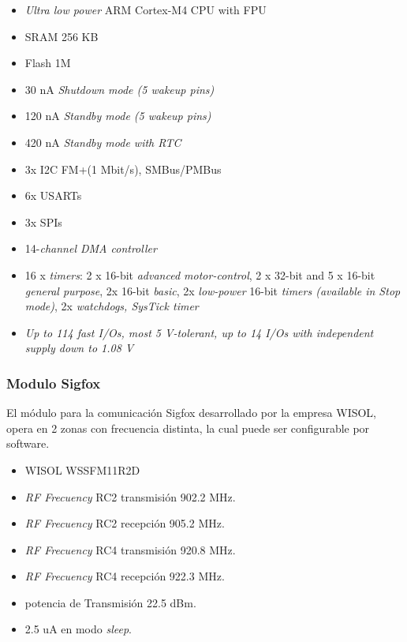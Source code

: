 \begin{itemize}
    \item \textit{Ultra low power} ARM Cortex\textregistered-M4  CPU with FPU
    \item  SRAM 256 KB
    \item  Flash 1M
    \item 30 nA \textit{Shutdown mode (5 wakeup pins)}
    \item 120 nA \textit{Standby mode (5 wakeup pins)}
    \item 420 nA \textit{Standby mode with RTC}
   \item 3x I2C FM+(1 Mbit/s), SMBus/PMBus 
   \item 6x USARTs
   \item 3x SPIs
   \item 14-\textit{channel DMA controller}
    \item 16 x \textit{ timers}: 2 x 16-bit \textit{advanced motor-control}, 2 x 32-bit and 5 x 16-bit \textit{general purpose}, 2x 16-bit \textit{basic}, 2x \textit{low-power} 16-bit \textit{timers (available in Stop mode)}, 2x \textit{watchdogs, SysTick timer}
    \item \textit{Up to 114 fast I/Os, most 5 V-tolerant, up to 14 I/Os with independent supply down to 1.08 V}
\end{itemize}



\subsubsection{Modulo Sigfox}
El módulo para la comunicación Sigfox desarrollado por la empresa WISOL, opera en 2 zonas con frecuencia distinta, la cual puede ser configurable por software.
\begin{itemize}
    \item WISOL WSSFM11R2D \protect\footnotemark
    \item \textit{RF Frecuency} RC2 transmisión 902.2 MHz.
    \item \textit{RF Frecuency} RC2 recepción 905.2 MHz.
    \item \textit{RF Frecuency} RC4 transmisión 920.8 MHz.
    \item \textit{RF Frecuency} RC4 recepción 922.3 MHz.
    \item potencia de Transmisión 22.5 dBm.
    \item 2.5 uA en modo \textit{sleep}.
\end{itemize}


